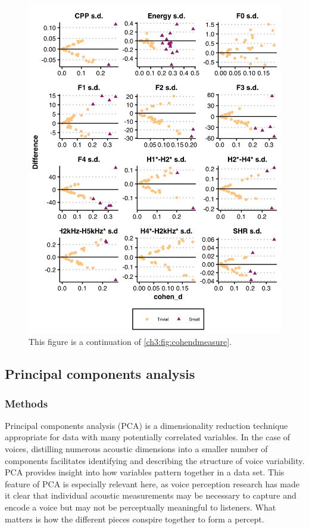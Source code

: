 \begin{figure}[htbp]
    \begin{center}
    \includegraphics[width=0.9\linewidth]{figures/ch3_cohend_part2_5in.png} 
    \caption{This figure is a continuation of \ref{ch3:fig:cohendmeasure}.}
    \label{ch3:fig:cohendsd}
    \end{center}
\end{figure}

\subsection{Principal components analysis}\label{ch3:sec:pca}

\subsubsection{Methods}

Principal components analysis (PCA) is a dimensionality reduction technique appropriate for data with many potentially correlated variables. In the case of voices, distilling numerous acoustic dimensions into a smaller number of components facilitates identifying and describing the structure of voice variability. PCA provides insight into how variables pattern together in a data set. This feature of PCA is especially relevant here, as voice perception research has made it clear that individual acoustic measurements may be necessary to capture and encode a voice but may not be perceptually meaningful to listeners. What matters is how the different pieces conspire together to form a percept. 

